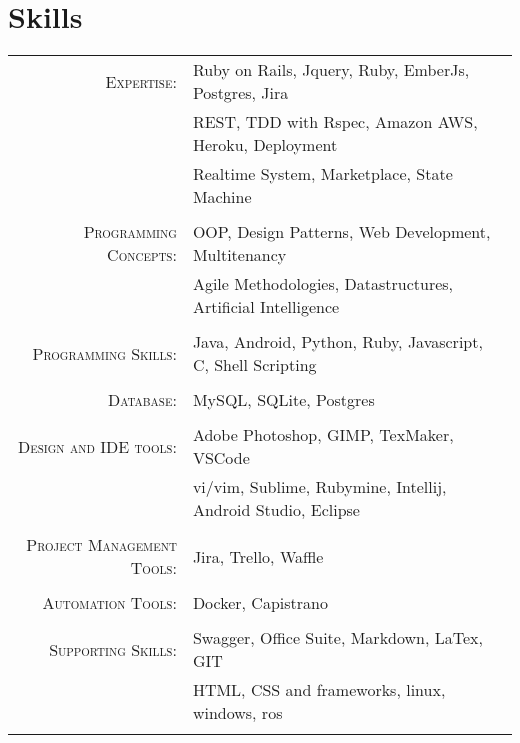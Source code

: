 \documentclass[a4paper,10pt]{article}
\begin{document}
\section{Skills}
\begin{tabular}{rl}	
\textsc{Expertise:} &Ruby on Rails, Jquery, Ruby, EmberJs, Postgres, Jira\\
								& REST, TDD with Rspec, Amazon AWS, Heroku, Deployment \\
								& Realtime System, Marketplace, State Machine\\\\
\textsc{Programming Concepts:} &OOP, Design Patterns, Web Development, Multitenancy \\
								&  Agile Methodologies, Datastructures, Artificial Intelligence\\\\
\textsc{Programming Skills:}  & Java, Android, Python, Ruby, Javascript, C, Shell Scripting\\\\
\textsc{Database:} & MySQL, SQLite, Postgres\\\\

\textsc{Design and IDE tools:} & Adobe Photoshop, GIMP, TexMaker, VSCode\\
							   & vi/vim, Sublime, Rubymine, Intellij, Android Studio, Eclipse\\\\
\textsc{Project Management Tools:} & Jira, Trello, Waffle\\\\	
\textsc{Automation Tools:} &Docker, Capistrano\\\\
\textsc{Supporting Skills:} & Swagger, Office Suite, Markdown, LaTex, GIT\\
		& HTML, CSS and frameworks, linux, windows, ros \\\\						   
		 
\end{tabular}
\end{document}
